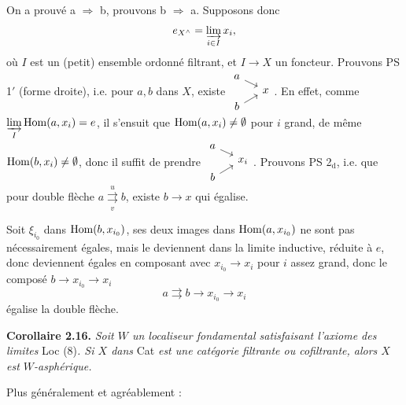On a prouvé a $\Longrightarrow$ b, prouvons b $\Longrightarrow$ a. Supposons donc
\[
e_{X^\wedge} = \varinjlim_{i \in I} x_i,
\]
où $I$ est un (petit) ensemble ordonné filtrant, et $I \longrightarrow X$ un foncteur. Prouvons PS 1$'$ (forme droite), i.e. pour $a, b$ dans $X$, existe $\vcenter{\hbox{\begin{tikzcd}[row sep=0.1em, column sep=1.2em]
a \arrow[dr] & \\
& x \\
b \arrow[ur] &
\end{tikzcd}}}$. En effet, comme $\varinjlim\limits_{I} \operatorname{Hom}(a,x_i) = e$, il s'ensuit que $\operatorname{Hom}(a,x_i) \neq \emptyset$ pour $i$ grand, de même $\operatorname{Hom}(b,x_i) \neq \emptyset$, donc il suffit de prendre $\vcenter{\hbox{\begin{tikzcd}[row sep=0.1em, column sep=1.2em]
a \arrow[dr] & \\
& x_i \\
b \arrow[ur] &
\end{tikzcd}}}$. Prouvons PS 2$_{\mathrm{d}}$, i.e. que pour double flèche $a \overset{u}{\underset{v}{\rightrightarrows}} b$, existe $b \longrightarrow x$ qui égalise.


Soit $\xi_{i_0}$ dans $\operatorname{Hom}(b,x_{i_0})$, ses deux images dans $\operatorname{Hom}(a,x_{i_0})$ ne sont pas nécessairement égales, mais le deviennent dans la limite inductive, réduite à $e$, donc deviennent égales en composant avec $x_{i_0} \longrightarrow x_i$ pour $i$ assez grand, donc le composé $b \longrightarrow x_{i_0} \longrightarrow x_i$
\[
a \rightrightarrows b \longrightarrow x_{i_0} \longrightarrow x_i
\]
égalise la double flèche.

\noindent\textbf{Corollaire 2.16.} \textit{Soit $W$ un localiseur fondamental satisfaisant l'axiome des limites} Loc (8)\textit{. Si $X$ dans} Cat \textit{est une catégorie filtrante ou cofiltrante, alors $X$ est $W$-asphérique.}

Plus généralement et agréablement :

